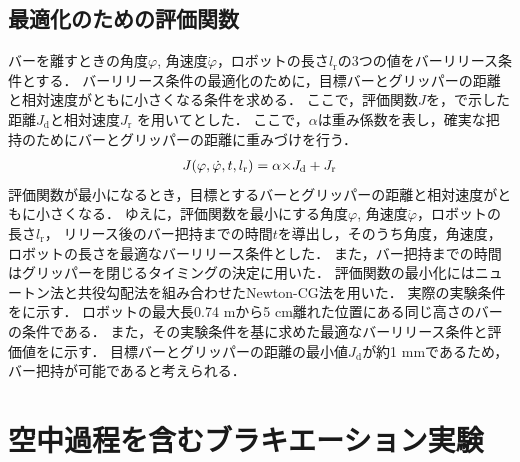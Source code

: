         \subsection{最適化のための評価関数}
        
        バーを離すときの角度$\varphi$, 角速度$\dot{\varphi}$，ロボットの長さ$l_{\mathrm{r}}$の3つの値をバーリリース条件とする．
        バーリリース条件の最適化のために，目標バーとグリッパーの距離と相対速度がともに小さくなる条件を求める．
        ここで，評価関数$J$を，で示した距離$J_{\mathrm{d}}$と相対速度$J_{\mathrm{r}}$
        を用いてとした．
        ここで，$\alpha$は重み係数を表し，確実な把持のためにバーとグリッパーの距離に重みづけを行う．
        \begin{eqnarray}
          \equlabel{J}
          J(\varphi,\dot{\varphi},t,l_{\mathrm{r}})=\alpha{\times}J_{\mathrm{d}}+J_{\mathrm{r}}
        \end{eqnarray}
        評価関数が最小になるとき，目標とするバーとグリッパーの距離と相対速度がともに小さくなる．
        ゆえに，評価関数を最小にする角度$\varphi$, 角速度$\dot{\varphi}$，ロボットの長さ$l_{\mathrm{r}}$，
        リリース後のバー把持までの時間$t$を導出し，そのうち角度，角速度，ロボットの長さを最適なバーリリース条件とした．
        また，バー把持までの時間はグリッパーを閉じるタイミングの決定に用いた．
        評価関数の最小化にはニュートン法と共役勾配法を組み合わせたNewton-CG法を用いた．
        実際の実験条件をに示す．
        ロボットの最大長0.74 mから5 cm離れた位置にある同じ高さのバーの条件である．
        また，その実験条件を基に求めた最適なバーリリース条件と評価値をに示す．
        目標バーとグリッパーの距離の最小値$J_{\mathrm{d}}$が約1 mmであるため，バー把持が可能であると考えられる．

        \section{空中過程を含むブラキエーション実験}
